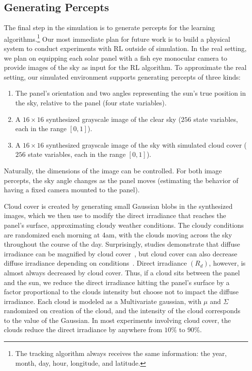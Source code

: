 \documentclass{article}
\begin{document}
{%
\subsection{Generating Percepts}


The final step in the simulation is to generate percepts for the learning algorithms.\footnote{The tracking algorithm always receives the same information: the year, month, day, hour, longitude, and latitude.} Our most immediate plan for future work is to build a physical system to conduct experiments with RL outside of simulation. In the real setting, we plan on equipping each solar panel with a fish eye monocular camera to provide images of the sky as input for the RL algorithm. To approximate the real setting, our simulated environment supports generating percepts of three kinds:
\begin{enumerate}
\item The panel's orientation and two angles representing the sun's true position in the sky, relative to the panel (four state variables).
\item A $16 \times 16$ synthesized grayscale image of the clear sky ($256$ state variables, each in the range $[0,1]$).
\item A $16\times 16$ synthesized grayscale image of the sky with simulated cloud cover ($256$ state variables, each in the range $[0,1]$).
\end{enumerate}
Naturally, the dimensions of the image can be controlled. For both image percepts, the sky angle changes as the panel moves (estimating the behavior of having a fixed camera mounted to the panel).

Cloud cover is created by generating small Gaussian blobs in the synthesized images, which we then use to modify the direct irradiance that reaches the panel's surface, approximating cloudy weather conditions. The cloudy conditions are randomized each morning at 4am, with the clouds moving across the sky throughout the course of the day. Surprisingly, studies demonstrate that diffuse irradiance can be magnified by cloud cover~\cite{robinson1966solar}, but cloud cover can also decrease diffuse irradiance depending on conditions~\cite{pfister2003cloud}. Direct irradiance $(R_d)$, however, is almost always decreased by cloud cover. Thus, if a cloud sits between the panel and the sun, we reduce the direct irradiance hitting the panel's surface by a factor proportional to the clouds intensity but choose not to impact the diffuse irradiance. Each cloud is modeled as a Multivariate gaussian, with $\mu$ and $\Sigma$ randomized on creation of the cloud, and the intensity of the cloud corresponds to the value of the Gaussian. In most experiments involving cloud cover, the clouds reduce the direct irradiance by anywhere from $10\%$ to $90\%$.



}
\end{document}
